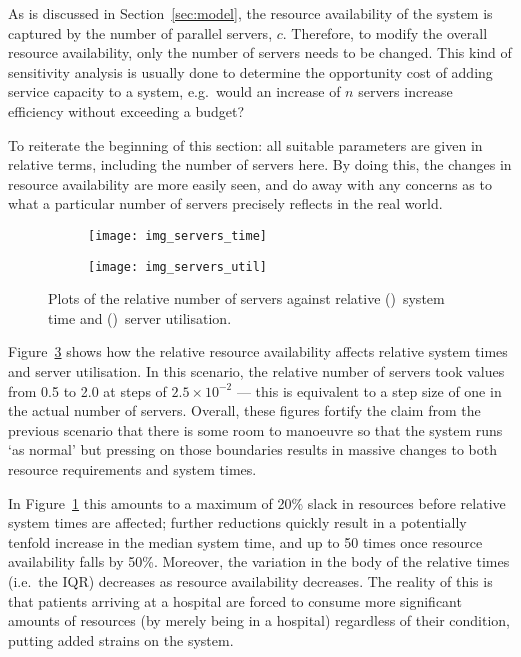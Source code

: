 As is discussed in Section~\ref{sec:model}, the resource availability of the
system is captured by the number of parallel servers, \(c\). Therefore, to
modify the overall resource availability, only the number of servers needs to be
changed. This kind of sensitivity analysis is usually done to determine the
opportunity cost of adding service capacity to a system, e.g.\ would an increase
of \(n\) servers increase efficiency without exceeding a budget?

To reiterate the beginning of this section: all suitable parameters are given in
relative terms, including the number of servers here. By doing this, the
changes in resource availability are more easily seen, and do away with any
concerns as to what a particular number of servers precisely reflects in the
real world.

\begin{figure}
    \centering
    \begin{subfigure}{.5\imgwidth}
        \texttt{[image: img\_servers\_time]}
        \caption{}\label{fig:servers_time}
    \end{subfigure}\hfill%
    \begin{subfigure}{.5\imgwidth}
        \texttt{[image: img\_servers\_util]}
        \caption{}\label{fig:servers_util}
    \end{subfigure}
    \caption{%
        Plots of the relative number of servers against relative
        ()~system time and
        ()~server utilisation.
    }\label{fig:servers}
\end{figure}

Figure~\ref{fig:servers} shows how the relative resource availability affects
relative system times and server utilisation. In this scenario, the relative
number of servers took values from 0.5 to 2.0 at steps of \(2.5 \times 10^{-2}\)
--- this is equivalent to a step size of one in the actual number of servers.
Overall, these figures fortify the claim from the previous scenario that there
is some room to manoeuvre so that the system runs `as normal' but pressing on
those boundaries results in massive changes to both resource requirements and
system times.

In Figure~\ref{fig:servers_time} this amounts to a maximum of 20\% slack in
resources before relative system times are affected; further reductions quickly
result in a potentially tenfold increase in the median system time, and up to 50
times once resource availability falls by 50\%. Moreover, the variation in the
body of the relative times (i.e.\ the IQR) decreases as resource availability
decreases. The reality of this is that patients arriving at a hospital are
forced to consume more significant amounts of resources (by merely being in a
hospital) regardless of their condition, putting added strains on the system.

